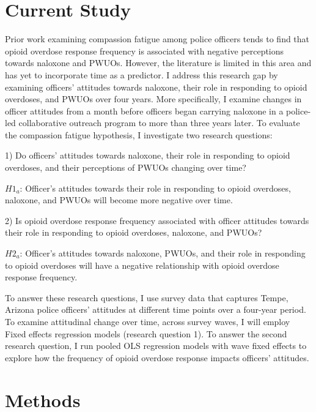 \section{Current Study}

Prior work examining compassion fatigue among police officers tends to find that opioid overdose response frequency is associated with negative perceptions towards naloxone and PWUOs. However, the literature is limited in this area and has yet to incorporate time as a predictor. I address this research gap by examining officers’ attitudes towards naloxone, their role in responding to opioid overdoses, and PWUOs over four years. More specifically, I examine changes in officer attitudes from a month before officers began carrying naloxone in a police-led collaborative outreach program to more than three years later. To evaluate the compassion fatigue hypothesis, I investigate two research questions:

1) Do officers’ attitudes towards naloxone, their role in responding to opioid overdoses, and their perceptions of PWUOs changing over time? 

\begin{flushleft}
\(H1_a\): Officer's attitudes towards their role in responding to opioid overdoses, naloxone, and PWUOs will become more negative over time.
\end{flushleft}

2) Is opioid overdose response frequency associated with officer attitudes towards their role in responding to opioid overdoses, naloxone, and PWUOs? 

\begin{flushleft}
\(H2_a\): Officer's attitudes towards naloxone, PWUOs, and their role in responding to opioid overdoses will have a negative relationship with opioid overdose response frequency.
\end{flushleft}

To answer these research questions, I use survey data that captures Tempe, Arizona police officers’ attitudes at different time points over a four-year period. To examine attitudinal change over time, across survey waves, I will employ Fixed effects regression models (research question 1). To answer the second research question, I run pooled OLS regression models with wave fixed effects to explore how the frequency of opioid overdose response impacts officers’ attitudes.

\section{Methods}
